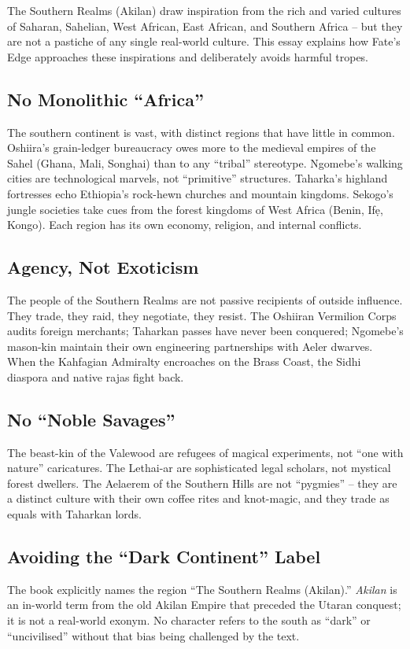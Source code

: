 \documentclass[12pt,oneside]{book}
\begin{document}
The Southern Realms (Akilan) draw inspiration from the rich and varied cultures of Saharan, Sahelian, West African, East African, and Southern Africa -- but they are not a pastiche of any single real-world culture. This essay explains how Fate's Edge approaches these inspirations and deliberately avoids harmful tropes.

\subsection*{No Monolithic ``Africa''}
The southern continent is vast, with distinct regions that have little in common. Oshiira's grain-ledger bureaucracy owes more to the medieval empires of the Sahel (Ghana, Mali, Songhai) than to any ``tribal'' stereotype. Ngomebe's walking cities are technological marvels, not ``primitive'' structures. Taharka's highland fortresses echo Ethiopia's rock-hewn churches and mountain kingdoms. Sekogo's jungle societies take cues from the forest kingdoms of West Africa (Benin, Ifẹ, Kongo). Each region has its own economy, religion, and internal conflicts.

\subsection*{Agency, Not Exoticism}
The people of the Southern Realms are not passive recipients of outside influence. They trade, they raid, they negotiate, they resist. The Oshiiran Vermilion Corps audits foreign merchants; Taharkan passes have never been conquered; Ngomebe's mason-kin maintain their own engineering partnerships with Aeler dwarves. When the Kahfagian Admiralty encroaches on the Brass Coast, the Sidhi diaspora and native rajas fight back.

\subsection*{No ``Noble Savages''}
The beast-kin of the Valewood are refugees of magical experiments, not ``one with nature'' caricatures. The Lethai-ar are sophisticated legal scholars, not mystical forest dwellers. The Aelaerem of the Southern Hills are not ``pygmies'' -- they are a distinct culture with their own coffee rites and knot-magic, and they trade as equals with Taharkan lords.

\subsection*{Avoiding the ``Dark Continent'' Label}
The book explicitly names the region ``The Southern Realms (Akilan).'' \textit{Akilan} is an in-world term from the old Akilan Empire that preceded the Utaran conquest; it is not a real-world exonym. No character refers to the south as ``dark'' or ``uncivilised'' without that bias being challenged by the text.
\end{document}
